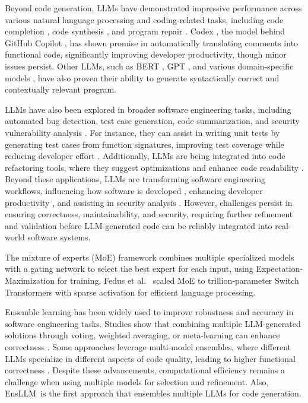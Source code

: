 \documentclass{article}
\newcommand{\tool}{EnsLLM}
\begin{document}
Beyond code generation, LLMs have demonstrated impressive performance across various natural language processing and coding-related tasks, including code completion \cite{deng2022fuzzing, huang2022prompt, jain2022jigsaw, li2022competition, xu2022systematic}, code synthesis \cite{liu2023your}, and program repair \cite{xia2023automated}. Codex \cite{codex}, the model behind GitHub Copilot \cite{copilot}, has shown promise in automatically translating comments into functional code, significantly improving developer productivity, though minor issues persist. Other LLMs, such as BERT \cite{devlin2018bert, tian2023best}, GPT \cite{gpt4, chatGPT, xia2023keep}, and various domain-specific models \cite{le2023invalidator, paul2023automated}, have also proven their ability to generate syntactically correct and contextually relevant program.

LLMs have also been explored in broader software engineering tasks, including automated bug detection, test case generation, code summarization, and security vulnerability analysis \cite{rahul2023llm, mueller2023automated}. For instance, they can assist in writing unit tests by generating test cases from function signatures, improving test coverage while reducing developer effort \cite{mueller2023automated}. Additionally, LLMs are being integrated into code refactoring tools, where they suggest optimizations and enhance code readability \cite{zhao2022large}. Beyond these applications, LLMs are transforming software engineering workflows, influencing how software is developed \cite{imai2022github, liu2023fill}, enhancing developer productivity \cite{dakhel2023github, ziegler2022productivity}, and assisting in security analysis \cite{pearce2023examining}. However, challenges persist in ensuring correctness, maintainability, and security, requiring further refinement and validation before LLM-generated code can be reliably integrated into real-world software systems.

The mixture of experts (MoE) framework \cite{jordan1994hierarchical} combines multiple specialized models with a gating network to select the best expert for each input, using Expectation-Maximization for training. Fedus et al.~\cite{fedus2021switch} scaled MoE to trillion-parameter Switch Transformers with sparse activation for efficient language processing. 

Ensemble learning has been widely used to improve robustness and accuracy in software engineering tasks. Studies show that combining multiple LLM-generated solutions through voting, weighted averaging, or meta-learning can enhance correctness \cite{zhang2023ensemble, wang2023code}. Some approaches leverage multi-model ensembles, where different LLMs specialize in different aspects of code quality, leading to higher functional correctness \cite{wang2023code}. Despite these advancements, computational efficiency remains a challenge when using multiple models for selection and refinement. Also, \tool\ is the first approach that ensembles multiple LLMs for code generation.
\end{document}
